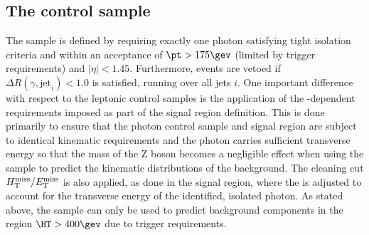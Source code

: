 \subsection{The \texorpdfstring{\gj}{photon plus jets} control sample}
\label{subsec:photoncontrolSelection}


The \gj sample is defined by requiring exactly one photon satisfying
tight isolation criteria and within an acceptance of $\pt > 175\gev$
(limited by trigger requirements) and $|\eta| < 1.45$. Furthermore,
events are vetoed if $\Delta R(\gamma,\textrm{jet}_i) < 1.0$ is
satisfied, running over all jets $i$. One important difference with
respect to the leptonic control samples is the application of the
\HT-dependent \alphat requirements imposed as part of the signal
region definition. This is done primarily to ensure that the photon
control sample and signal region are subject to identical kinematic
requirements and the photon carries sufficient transverse energy so
that the mass of the Z boson becomes a negligible effect when using
the \gj sample to predict the kinematic distributions of the \znunu
background. The cleaning cut $\mbox{$H_{\rm T}^{\rm miss}$}/\mbox{$E_\text{T}^{\rm miss}$}$ is also applied, as done in
the signal region, where the \met is adjusted to account for the
transverse energy of the identified, isolated photon. As stated above,
the \gj sample can only be used to predict background components in
the region $\HT > 400\gev$ due to trigger requirements.
